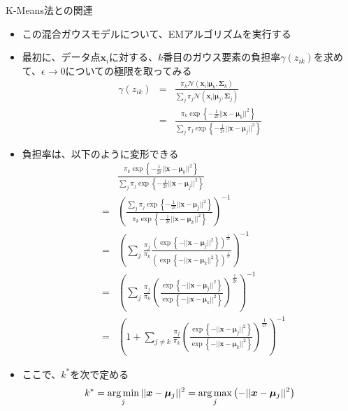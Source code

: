\documentclass[dvipdfmx,notheorems,t]{beamer}
\begin{document}
\begin{frame}{K-Means法との関連}
\begin{itemize}
\begin{itemize}
		\item この混合ガウスモデルについて、EMアルゴリズムを実行する
		\newline
		
		\item 最初に、データ点$\bm{x}_i$に対する、$k$番目のガウス要素の負担率$\gamma(z_{ik})$を求めて、$\epsilon \to 0$についての極限を取ってみる
		\begin{eqnarray}
			\gamma(z_{ik}) &=& \frac{\pi_k \mathcal{N}(\bm{x}_i | \bm{\mu}_k, \bm{\Sigma}_k)}{\sum_j \pi_j \mathcal{N}(\bm{x}_i | \bm{\mu}_j, \bm{\Sigma}_j)} \nonumber \\
			&=& \frac{\pi_k \exp \left\{ -\frac{1}{2\epsilon} || \bm{x} - \bm{\mu}_k ||^2 \right\}}{\sum_j \pi_j \exp \left\{ -\frac{1}{2\epsilon} || \bm{x} - \bm{\mu}_j ||^2 \right\}}
		\end{eqnarray}
		
		\item 負担率は、以下のように変形できる
		\begin{eqnarray}
			&& \frac{\pi_k \exp \left\{ -\frac{1}{2\epsilon} || \bm{x} - \bm{\mu}_k ||^2 \right\}}{\sum_j \pi_j \exp \left\{ -\frac{1}{2\epsilon} || \bm{x} - \bm{\mu}_j ||^2 \right\}} \nonumber \\
			&=& \left( \frac{\sum_j \pi_j \exp \left\{ -\frac{1}{2\epsilon} || \bm{x} - \bm{\mu}_j ||^2 \right\}}{\pi_k \exp \left\{ -\frac{1}{2\epsilon} || \bm{x} - \bm{\mu}_k ||^2 \right\}} \right)^{-1} \nonumber \\
			&=& \left( \sum_j \frac{\pi_j}{\pi_k} \frac{\left( \exp \left\{ - || \bm{x} - \bm{\mu}_j ||^2 \right\} \right)^{\frac{1}{2\epsilon}}}{\left( \exp \left\{ - || \bm{x} - \bm{\mu}_k ||^2 \right\} \right)^{\frac{1}{2\epsilon}}} \right)^{-1} \nonumber \\
			&=& \left( \sum_j \frac{\pi_j}{\pi_k} \left( \frac{\exp \left\{ - || \bm{x} - \bm{\mu}_j ||^2 \right\}}{\exp \left\{ - || \bm{x} - \bm{\mu}_k ||^2 \right\}} \right)^{\frac{1}{2\epsilon}} \right)^{-1} \nonumber \\
			&=& \left( 1 + \sum_{j \neq k} \frac{\pi_j}{\pi_k} \left( \frac{\exp \left\{ - || \bm{x} - \bm{\mu}_j ||^2 \right\}}{\exp \left\{ - || \bm{x} - \bm{\mu}_k ||^2 \right\}} \right)^{\frac{1}{2\epsilon}} \right)^{-1}
		\end{eqnarray}
		\newline
		
		\item ここで、$k^*$を次で定める
		\begin{equation}
			k^* = \operatorname*{arg\,min}_j || \bm{x} - \bm{\mu}_j ||^2 = \operatorname*{arg\,max}_j \left( - || \bm{x} - \bm{\mu}_j ||^2 \right)
		\end{equation}
		

\end{itemize}
\end{itemize}
\end{frame}
\end{document}

